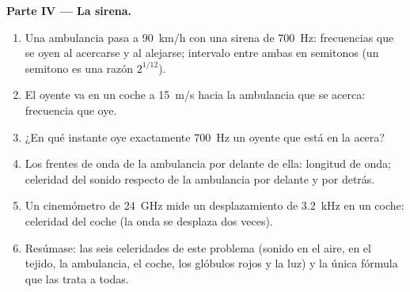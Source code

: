 \begin{problem}
\medskip
\noindent\textbf{Parte IV --- La sirena.}
\begin{enumerate}[resume]
  \item Una ambulancia pasa a \qty{90}{km/h} con una sirena de \qty{700}{Hz}:
        frecuencias que se oyen al acercarse y al alejarse; intervalo
        entre ambas en semitonos (un semitono es una razón $2^{1/12}$).
  \item El oyente va en un coche a \qty{15}{m/s} hacia la ambulancia que
        se acerca: frecuencia que oye.
  \item ¿En qué instante oye exactamente \qty{700}{Hz} un oyente que está
        en la acera?
  \item Los frentes de onda de la ambulancia por delante de ella: longitud
        de onda; celeridad del sonido respecto de la ambulancia por delante
        y por detrás.
  \item Un cinemómetro de \qty{24}{GHz} mide un desplazamiento de
        \qty{3.2}{kHz} en un coche: celeridad del coche (la onda se
        desplaza dos veces).
  \item Resúmase: las seis celeridades de este problema (sonido en el
        aire, en el tejido, la ambulancia, el coche, los glóbulos rojos y
        la luz) y la única fórmula que las trata a todas.
\end{enumerate}
\end{problem}
